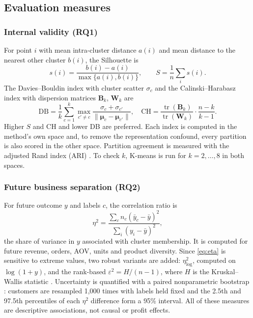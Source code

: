 \documentclass[conference,10pt]{IEEEtran}
\newcommand{\etasq}{\eta^{2}}
\begin{document}
\subsection{Evaluation measures}
\subsubsection{Internal validity (RQ1)}
For point $i$ with mean intra-cluster distance $a(i)$ and mean distance to
the nearest other cluster $b(i)$, the Silhouette
\cite{rousseeuw1987silhouettes} is
\begin{equation}
s(i) = \frac{b(i)-a(i)}{\max\{a(i),b(i)\}}, \qquad
S = \frac{1}{n}\sum_i s(i) .
\end{equation}
The Davies--Bouldin index with cluster scatter
$\sigma_c$ and the Calinski--Harabasz index \cite{ikotun2025cluster} with
dispersion matrices $\mathbf{B}_k$, $\mathbf{W}_k$ are
\begin{equation}
\mathrm{DB} = \frac{1}{k}\sum_{c=1}^{k}\max_{c'\neq c}
\frac{\sigma_c+\sigma_{c'}}{\lVert\boldsymbol{\mu}_c-\boldsymbol{\mu}_{c'}\rVert},
\quad
\mathrm{CH} = \frac{\operatorname{tr}(\mathbf{B}_k)}{\operatorname{tr}(\mathbf{W}_k)}
\cdot\frac{n-k}{k-1}.
\end{equation}
Higher $S$ and CH and lower DB are preferred. Each index is computed in the
method's own space and, to remove the representation confound, every
partition is also scored in the other space. Partition agreement is measured
with the adjusted Rand index (ARI) \cite{warrens2022understanding}. To check $k$,
K-means is run for $k=2,\dots,8$ in both spaces.

\subsubsection{Future business separation (RQ2)}
For future outcome $y$ and labels $c$, the correlation ratio
\cite{lakens2013calculating} is
\begin{equation}
\etasq = \frac{\sum_{c} n_c(\bar{y}_c-\bar{y})^2}{\sum_i (y_i-\bar{y})^2},
\label{eq:eta}
\end{equation}
the share of variance in $y$ associated with cluster membership. It is
computed for future revenue, orders, AOV, units and product diversity. Since
\eqref{eq:eta} is sensitive to extreme values, two robust variants are added:
$\etasq_{\log}$, computed on $\log(1+y)$, and the rank-based
$\varepsilon^2 = H/(n-1)$, where $H$ is the Kruskal--Wallis statistic
\cite{fielperes2026effect,virtanen2020scipy}. Uncertainty is quantified with a paired
nonparametric bootstrap \cite{rousselet2021percentile}: customers are
resampled 1,000 times with labels held fixed and the 2.5th and 97.5th
percentiles of each $\etasq$ difference form a 95\% interval. All of these
measures are descriptive associations, not causal or profit effects.
\end{document}
